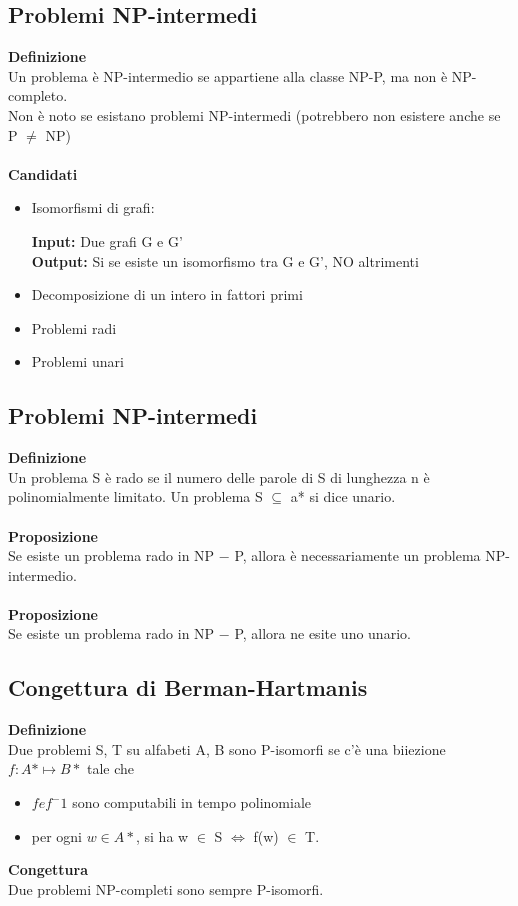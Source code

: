 \subsection{Problemi NP-intermedi}
\textbf{Definizione}\\
Un problema è NP-intermedio se appartiene alla classe NP-P, ma non è
NP-completo.\\
Non è noto se esistano problemi NP-intermedi (potrebbero non esistere anche se P $\neq$ NP)\\\\
\textbf{Candidati}
\begin{itemize}
    \item Isomorfismi di grafi:
    
    \textbf{Input:} Due grafi G e G'\\
    \textbf{Output:} Si se esiste un isomorfismo tra G e G', NO altrimenti
    
    \item Decomposizione di un intero in fattori primi
    
    \item Problemi radi
    
    \item Problemi unari
\end{itemize}
\subsection{Problemi NP-intermedi}
\textbf{Definizione}\\
Un problema S è rado se il numero delle parole di S di lunghezza n è polinomialmente limitato.
Un problema S $\subseteq$ a* si dice unario.\\\\
\textbf{Proposizione}\\
Se esiste un problema rado in NP $-$ P, allora è necessariamente un problema NP-intermedio.\\\\
\textbf{Proposizione}\\
Se esiste un problema rado in NP $-$ P, allora ne esite uno unario.
\newpage
\subsection{Congettura di Berman-Hartmanis}
\textbf{Definizione}\\
Due problemi S, T su alfabeti A, B sono P-isomorfi se c’è una biiezione $f: A* \mapsto B*$ tale che
\begin{itemize}
    \item $f e f^-1$ sono computabili in tempo polinomiale
    
    \item per ogni $w \in A*$, si ha w $\in$ S $\Longleftrightarrow$ f(w) $\in$ T.
\end{itemize}
\textbf{Congettura}\\
Due problemi NP-completi sono sempre P-isomorfi.